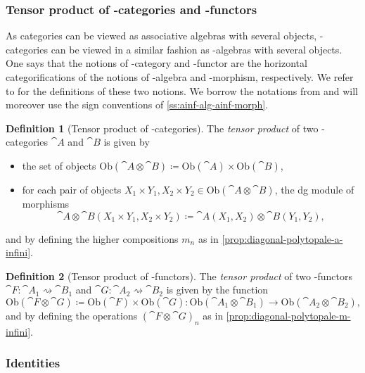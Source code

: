 \documentclass[JEP,XML,SOM,NoFloatCountersInSection,Unicode,published]{cedram}
\theoremstyle{definition}
\newtheorem{definition}{Definition}[section]
\theoremstyle{plain}
\begin{document}

\subsubsection{Tensor product of \Ainf -categories and \Ainf -functors}

As categories can be viewed as associative algebras with several objects, \Ainf -categories can be viewed in a similar fashion as \Ainf -algebras with several objects. One says that the notions of \Ainf -category and \Ainf -functor are the horizontal categorifications of the notions of \Ainf -algebra and \Ainf -morphism, respectively.
We refer to \cite[Chap.\,1]{Seidel08} for the definitions of these two notions.
We borrow the notations from \cite{Seidel08} and will moreover use the sign conventions of \cref{ss:ainf-alg-ainf-morph}.

\begin{definition}[Tensor product of \Ainf -categories] \label{def:tensor-product-ainf-cat}
The \emph{tensor product} of two \Ainf-categories $\cat{A}$ and $\cat{B}$ is given by
\begin{itemize}
\item the set of objects $\mathrm{Ob}(\cat{A}\otimes \cat{B})\coloneqq \mathrm{Ob}(\cat{A})\times\mathrm{Ob}(\cat{B})$,
\item for each pair of objects $X_1\times Y_1,X_2\times Y_2 \in \mathrm{Ob}(\cat{A}\otimes \cat{B})$, the dg module of morphisms
\[
\cat{A}\otimes \cat{B}(X_1\times Y_1,X_2\times Y_2)\coloneqq \cat{A}(X_1,X_2)\otimes\cat{B}(Y_1,Y_2),
\]
\end{itemize}
and by defining the higher compositions $m_n$ as in \cref{prop:diagonal-polytopale-a-infini}.
\end{definition}

\begin{definition}[Tensor product of \Ainf -functors]
The \emph{tensor product} of two \Ainf\nobreakdash-func\-tors $\cat{F}:\cat{A}_1 \rightsquigarrow \cat{B}_1$ and $\cat{G}:\cat{A}_2 \rightsquigarrow \cat{B}_2$ is given by the function
\[
\mathrm{Ob}(\cat{F}\otimes \cat{G})\coloneqq \mathrm{Ob}(\cat{F})\times \mathrm{Ob}(\cat{G}) : \mathrm{Ob}(\cat{A}_1\otimes\cat{B}_1) \to \mathrm{Ob}(\cat{A}_2\otimes\cat{B}_2),
\]
and by defining the operations $(\cat{F} \otimes \cat{G})_n$ as in \cref{prop:diagonal-polytopale-m-infini}.
\end{definition}

\subsubsection{Identities}
\end{document}
